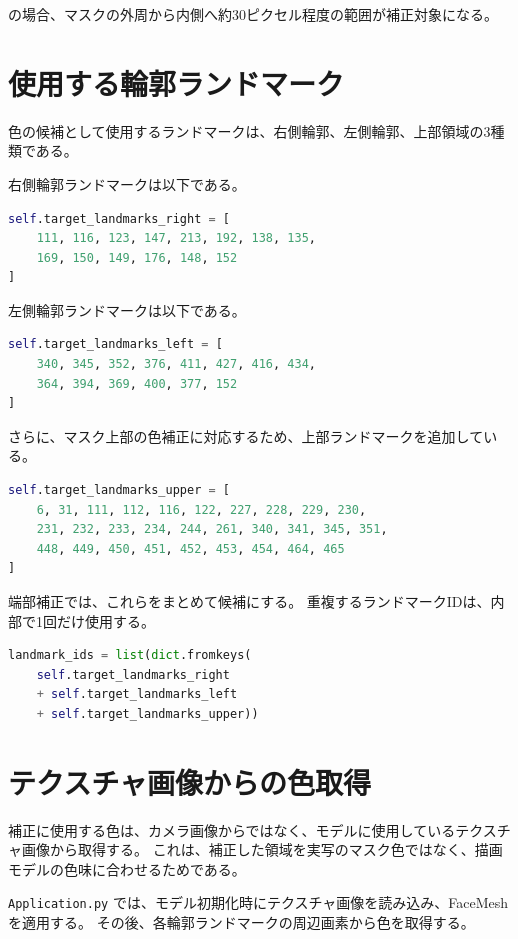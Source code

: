 \documentclass[uplatex,dvipdfmx]{jsarticle}
\begin{document}
の場合、マスクの外周から内側へ約30ピクセル程度の範囲が補正対象になる。

\section{使用する輪郭ランドマーク}

色の候補として使用するランドマークは、右側輪郭、左側輪郭、上部領域の3種類である。

右側輪郭ランドマークは以下である。

\begin{lstlisting}[language=Python]
self.target_landmarks_right = [
    111, 116, 123, 147, 213, 192, 138, 135,
    169, 150, 149, 176, 148, 152
]
\end{lstlisting}

左側輪郭ランドマークは以下である。

\begin{lstlisting}[language=Python]
self.target_landmarks_left = [
    340, 345, 352, 376, 411, 427, 416, 434,
    364, 394, 369, 400, 377, 152
]
\end{lstlisting}

さらに、マスク上部の色補正に対応するため、上部ランドマークを追加している。

\begin{lstlisting}[language=Python]
self.target_landmarks_upper = [
    6, 31, 111, 112, 116, 122, 227, 228, 229, 230,
    231, 232, 233, 234, 244, 261, 340, 341, 345, 351,
    448, 449, 450, 451, 452, 453, 454, 464, 465
]
\end{lstlisting}

端部補正では、これらをまとめて候補にする。
重複するランドマークIDは、内部で1回だけ使用する。

\begin{lstlisting}[language=Python]
landmark_ids = list(dict.fromkeys(
    self.target_landmarks_right
    + self.target_landmarks_left
    + self.target_landmarks_upper))
\end{lstlisting}

\section{テクスチャ画像からの色取得}

補正に使用する色は、カメラ画像からではなく、モデルに使用しているテクスチャ画像から取得する。
これは、補正した領域を実写のマスク色ではなく、描画モデルの色味に合わせるためである。

\texttt{Application.py} では、モデル初期化時にテクスチャ画像を読み込み、FaceMeshを適用する。
その後、各輪郭ランドマークの周辺画素から色を取得する。
\end{document}
